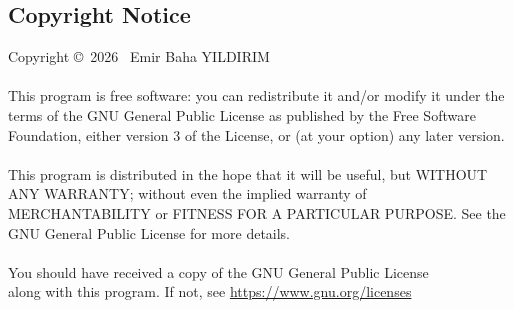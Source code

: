 \documentclass{article}
\begin{document}
\subsection{Copyright Notice}
Copyright \copyright \ 2026 \ Emir Baha YILDIRIM
\\
\\
This program is free software: you can redistribute it and/or modify it under
the terms of the GNU General Public License as published by the Free Software
Foundation, either version 3 of the License, or (at your option) any later
version.
\\
\\
This program is distributed in the hope that it will be useful, but WITHOUT ANY
WARRANTY; without even the implied warranty of MERCHANTABILITY or FITNESS FOR A
PARTICULAR PURPOSE. See the GNU General Public License for more details.
\\
\\
You should have received a copy of the GNU General Public License \\
along with this program.  If not, see
\href{https://www.gnu.org/licenses}{https://www.gnu.org/licenses}

\pagebreak

\end{document}
